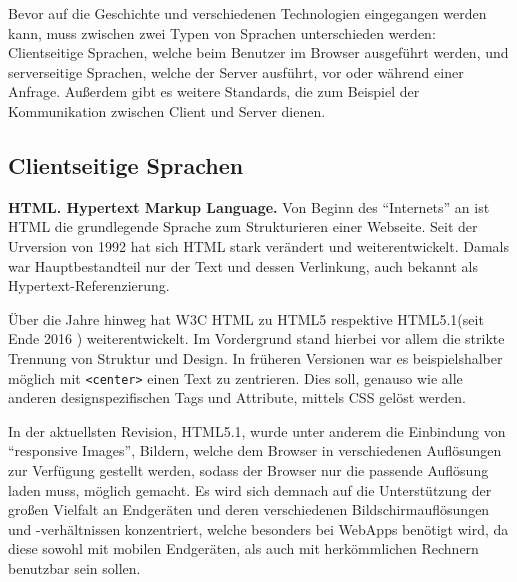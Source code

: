\documentclass[a4paper,12pt,ngerman,listof=numbered]{scrartcl}      %
\let\oldcite\cite
\renewcommand{\cite}[1]{\textsuperscript{\oldcite{#1}}}
\providecommand{\inlinecode}[1]{\texttt{#1}}
\begin{document}
	Bevor auf die Geschichte und verschiedenen Technologien eingegangen werden kann, muss zwischen zwei Typen von Sprachen unterschieden werden: Clientseitige Sprachen, welche beim Benutzer im Browser ausgeführt werden, und serverseitige Sprachen, welche der Server ausführt, vor oder während einer Anfrage. Außerdem gibt es weitere Standards, die zum Beispiel der Kommunikation zwischen Client und Server dienen.\par
	
	\subsection{Clientseitige Sprachen}
	
	\textbf{HTML. Hypertext Markup Language.} Von Beginn des ``Internets'' an ist HTML die grundlegende Sprache zum Strukturieren einer Webseite. Seit der Urversion von 1992 hat sich HTML stark verändert und weiterentwickelt. Damals war Hauptbestandteil nur der Text und dessen Verlinkung, auch bekannt als Hyper\-text-Re\-fe\-ren\-zie\-rung.\cite{htmlWiki}\par
	Über die Jahre hinweg hat W3C HTML zu HTML5 respektive HTML5.1(seit Ende 2016 \cite{html51}) weiterentwickelt. Im Vordergrund stand hierbei vor allem die strikte Trennung von Struktur und Design. In früheren Versionen war es beispielshalber möglich mit \inlinecode{<center>} einen Text zu zentrieren. Dies soll, genauso wie alle anderen designspezifischen Tags und Attribute, mittels CSS gelöst werden.\par
	In der aktuellsten Revision, HTML5.1, wurde unter anderem die Einbindung von ``responsive Images'', Bildern, welche dem Browser in verschiedenen Auflösungen zur Verfügung gestellt werden, sodass der Browser nur die passende Auflösung laden muss, möglich gemacht. Es wird sich demnach auf die Unterstützung der großen Vielfalt an Endgeräten und deren verschiedenen Bildschirmauflösungen und -verhältnissen konzentriert, welche besonders bei WebApps benötigt wird, da diese sowohl mit mobilen Endgeräten, als auch mit herkömmlichen Rechnern benutzbar sein sollen.\cite{html51blog}\par
	
\end{document}
